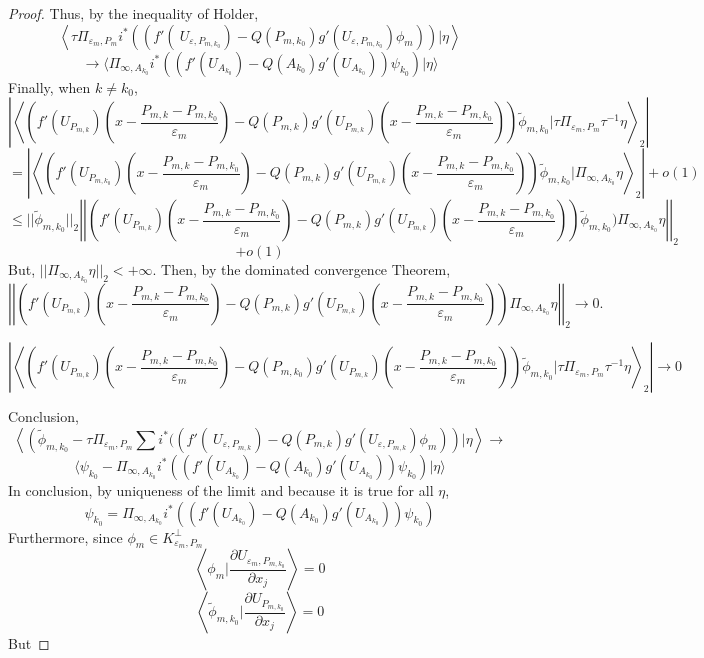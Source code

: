 \documentclass[12pt]{amsart}
\theoremstyle{plain}
\theoremstyle{definition}
\theoremstyle{remark}
\renewcommand{\epsilon}{\varepsilon}
\begin{document}
\begin{proof}
Thus, by the inequality of Holder, 
$$\left\langle \tau \Pi_{\epsilon_m,P_m}i^*((f'(\ U_{\epsilon,P_{m,{k_0}}})-Q(P_{m,{k_0}})g'( U_{\epsilon,P_{m,{k_0}}}){\phi}_{m}))|\eta\right\rangle$$$$\rightarrow \langle\Pi_{\infty,A_{k_0}} i^*((f'(U_{A_{k_0}})-Q(A_{k_0})g'(U_{A_{k_0}}))\psi_{k_0})|\eta \rangle $$
Finally, when $k\ne k_0$,
$$\left|\left\langle  \left(f'( U_{P_{m,k}})\left(x-\frac{P_{m,k}-P_{m,{k_0}}}{\epsilon_m}\right)-Q(P_{m,k})g'( U_{P_{m,k}})\left(x-\frac{P_{m,k}-P_{m,{k_0}}}{\epsilon_m}\right)\right)\tilde{\phi}_{m,{k_0}}|\tau\Pi_{\epsilon_m,P_m}\tau^{-1}\eta\right\rangle_2\right|$$
$$=\left|\left\langle  \left(f'( U_{P_{m,{k_0}}})\left(x-\frac{P_{m,k}-P_{m,{k_0}}}{\epsilon_m}\right)-Q(P_{m,{k}})g'( U_{P_{m,k}})\left(x-\frac{P_{m,k}-P_{m,{k_0}}}{\epsilon_m}\right)\right)\tilde{\phi}_{m,{k_0}}|\Pi_{\infty,A_{k_0}}\eta\right\rangle_2\right|+o(1)$$
$$\leq ||\tilde{\phi}_{m,{k_0}}||_2\left|\left| \left(f'( U_{P_{m,k}})\left(x-\frac{P_{m,k}-P_{m,{k_0}}}{\epsilon_m}\right)-Q(P_{m,k})g'( U_{P_{m,k}})\left(x-\frac{P_{m,k}-P_{m,{k_0}}}{\epsilon_m}\right)\right)\tilde{\phi}_{m,{k_0}})\Pi_{\infty,A_{k_0}}\eta\right|\right|_2 $$$$+o(1) $$
But, $||\Pi_{\infty,A_{k_0}}\eta||_2<+\infty $. Then, by the dominated convergence Theorem,
$$\left|\left| \left(f'( U_{P_{m,{k}}})\left(x-\frac{P_{m,k}-P_{m,{k_0}}}{\epsilon_m}\right)-Q(P_{m,k})g'( U_{P_{m,k}})\left(x-\frac{P_{m,k}-P_{m,{k_0}}}{\epsilon_m}\right)\right)\Pi_{\infty,A_{k_0}}\eta\right|\right|_2 \rightarrow 0.$$

$$\left|\left\langle  \left(f'( U_{P_{m,k}})\left(x-\frac{P_{m,k}-P_{m,{k_0}}}{\epsilon_m}\right)-Q(P_{m,{k_0}})g'( U_{P_{m,k}})\left(x-\frac{P_{m,{k}}-P_{m,{k_0}}}{\epsilon_m}\right)\right)\tilde{\phi}_{m,{k_0}}|\tau\Pi_{\epsilon_m,P_m}\tau^{-1}\eta\right\rangle_2\right|\rightarrow0$$

Conclusion, 
$$\left\langle\left(\tilde{\phi}_{m,{k_0}} -\tau\Pi_{\epsilon_m,P_m}\sum i^*((f'(\ U_{\epsilon,P_{m,k}})-Q(P_{m,k})g'( U_{\epsilon,P_{m,k}}){\phi}_{m})\right)|\eta\right\rangle \rightarrow $$$$\langle \psi_{k_0} -\Pi_{\infty,A_{k_0}} i^*((f'(U_{A_{k_0}})-Q(A_{k_0})g'(U_{A_{k_0}}))\psi_{k_0})|\eta\rangle$$
In conclusion, by uniqueness of the limit and because it is true for all $\eta$,
$$\psi_{k_0} = \Pi_{\infty,A_{k_0}}i^*((f'(U_{A_{k_0}})-Q(A_{k_0})g'(U_{A_{k_0}}))\psi_{k_0}) $$
Furthermore, since $\phi_m \in K_{\epsilon_m,P_m}^\perp$
$$\left\langle \phi_{m}\big| \frac{\partial U_{\epsilon_m,P_{m,k_0}}}{\partial x_j}\right\rangle=0$$
$$\left\langle \tilde{\phi}_{m,{k_0}}\big| \frac{\partial U_{P_{m,k_0}}}{\partial x_j}\right\rangle=0$$
But 


\end{proof}
\end{document}
